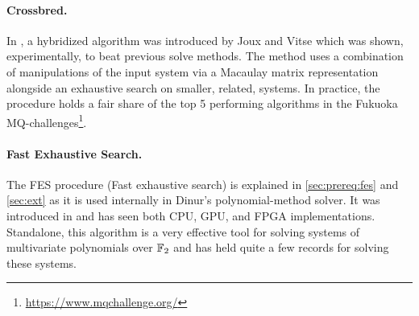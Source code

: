 \paragraph{Crossbred.} In \cite{cryptoeprint:2017/372}, a hybridized algorithm was introduced by Joux and Vitse which was shown, experimentally, to beat previous solve methods. The method uses a combination of manipulations of the input system via a Macaulay matrix representation alongside an exhaustive search on smaller, related, systems. In practice, the procedure holds a fair share of the top 5 performing algorithms in the Fukuoka MQ-challenges\footnote{\url{https://www.mqchallenge.org/}}. 

\paragraph{Fast Exhaustive Search.} The FES procedure (Fast exhaustive search) is explained in \cref{sec:prereq:fes} and \cref{sec:ext} as it is used internally in Dinur's polynomial-method solver. It was introduced in \cite{ches-2010-23990} and has seen both CPU, GPU, and FPGA implementations. Standalone, this algorithm is a very effective tool for solving systems of multivariate polynomials over $\mathbb{F}_2$ and has held quite a few records for solving these systems.

\newpage